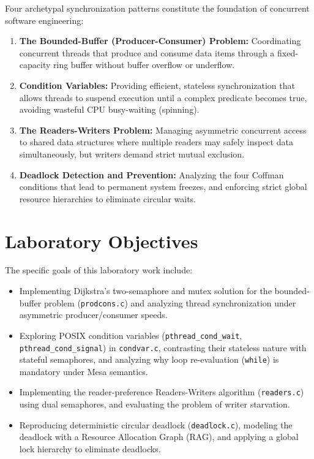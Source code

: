\documentclass[12pt,a4paper]{report}
\numberwithin{equation}{chapter}
\numberwithin{figure}{chapter}
\numberwithin{table}{chapter}
\begin{document}
Four archetypal synchronization patterns constitute the foundation of concurrent software engineering:
\begin{enumerate}
    \item \textbf{The Bounded-Buffer (Producer-Consumer) Problem:} Coordinating concurrent threads that produce and consume data items through a fixed-capacity ring buffer without buffer overflow or underflow.
    \item \textbf{Condition Variables:} Providing efficient, stateless synchronization that allows threads to suspend execution until a complex predicate becomes true, avoiding wasteful CPU busy-waiting (spinning).
    \item \textbf{The Readers-Writers Problem:} Managing asymmetric concurrent access to shared data structures where multiple readers may safely inspect data simultaneously, but writers demand strict mutual exclusion.
    \item \textbf{Deadlock Detection and Prevention:} Analyzing the four Coffman conditions that lead to permanent system freezes, and enforcing strict global resource hierarchies to eliminate circular waits.
\end{enumerate}

\section{Laboratory Objectives}
The specific goals of this laboratory work include:
\begin{itemize}
    \item Implementing Dijkstra's two-semaphore and mutex solution for the bounded-buffer problem (\texttt{prodcons.c}) and analyzing thread synchronization under asymmetric producer/consumer speeds.
    \item Exploring POSIX condition variables (\texttt{pthread\_cond\_wait}, \texttt{pthread\_cond\_signal}) in \texttt{condvar.c}, contrasting their stateless nature with stateful semaphores, and analyzing why loop re-evaluation (\texttt{while}) is mandatory under Mesa semantics.
    \item Implementing the reader-preference Readers-Writers algorithm (\texttt{readers.c}) using dual semaphores, and evaluating the problem of writer starvation.
    \item Reproducing deterministic circular deadlock (\texttt{deadlock.c}), modeling the deadlock with a Resource Allocation Graph (RAG), and applying a global lock hierarchy to eliminate deadlocks.
\end{itemize}
\end{document}
